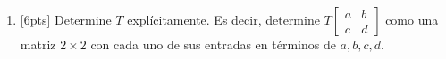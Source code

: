 \documentclass[11pt]{article}
\begin{document}
\begin{enumerate}
\begin{enumerate}
\vspace{6cm}

\item{}[6pts] Determine $T$ explícitamente. Es decir, determine $T\begin{bmatrix}a&b\\c&d\end{bmatrix}$ como una matriz $2\times 2$ con cada uno de sus entradas en términos de $a,b,c,d$.

\vspace{5cm}
\end{enumerate}
\end{enumerate}

\examfooter
\end{document}
